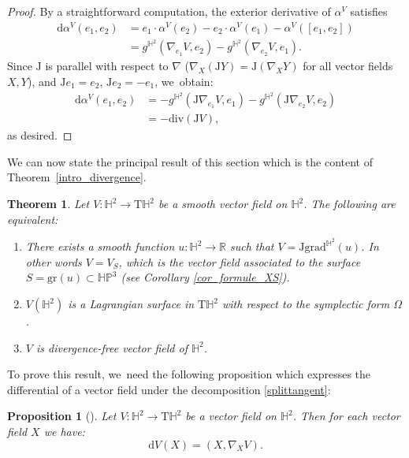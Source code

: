 \documentclass[10pt]{amsart}
\theoremstyle{plain}
\newtheorem{theorem}[cor]{Theorem}
\newtheorem{prop}[cor]{Proposition}
\theoremstyle{definition}
\newcommand{\HP}{\mathbb{HP}^3}
\newcommand{\grad}{\mathrm{grad}^{\mathbb{H}^2}}
\newcommand{\J}{\mathrm{J}}
\begin{document}
\begin{proof}
By a straightforward computation, the exterior derivative of \(\alpha^V \) satisfies
\begin{align*}
\mathrm{d} \alpha^V(e_1, e_2)
&= e_1 \cdot \alpha^V(e_2) - e_2 \cdot \alpha^V(e_1) - \alpha^V([e_1, e_2]) \\
&= g^{\mathbb{H}^2}(\nabla_{e_1} V, e_2) - g^{\mathbb{H}^2}(\nabla_{e_2} V, e_1).
\end{align*}
Since \(\mathrm{J} \) is parallel with respect to \(\nabla \) (\ie \(\nabla_X (\mathrm{J}Y) = \mathrm{J}(\nabla_X Y) \) for all vector fields \(X, Y \)), and \(\mathrm{J}e_1 = e_2 \), \(\mathrm{J}e_2 = -e_1 \), we~obtain:
\begin{align*}
\mathrm{d} \alpha^V(e_1, e_2)
&= -g^{\mathbb{H}^2}(\mathrm{J} \nabla_{e_1} V, e_1) - g^{\mathbb{H}^2}(\J\nabla_{e_2} V, e_2) \\
&= -\mathrm{div}(\mathrm{J}V),
\end{align*}
as desired.
\end{proof}

We can now state the principal result of this section which is the content of Theorem~\ref{intro_divergence}.
\begin{theorem}\label{Lagrange_vs_divergence_free}
Let $V:\mathbb{H}^2\to\mathrm{T}\mathbb{H}^2$ be a smooth vector field on $\mathbb{H}^2$. The following are equivalent:
\begin{enumerate}
\item\label{Lagrange_vs_divergence_free1} There exists a smooth function $u:\mathbb{H}^2\to\mathbb{R}$ such that $V=\J\grad(u)$. In other words $V=V_S$, which is the vector field associated to the surface $S=\mathrm{gr}(u)\subset\HP$ (see Corollary \ref{cor_formule_XS}).
\item\label{Lagrange_vs_divergence_free2} $V(\mathbb{H}^2)$ is a \emph{Lagrangian} surface in $\mathrm{T}\mathbb{H}^2$ with respect to the symplectic form $\Omega$.
\item\label{Lagrange_vs_divergence_free3} $V$ is divergence-free vector field of $\mathbb{H}^2$.
\end{enumerate}
\end{theorem}
To prove this result, we~need the following proposition which expresses the differential of a vector field under the decomposition \eqref{splittangent}:
\begin{prop}[{\cite[Prop.\,1.6]{on_harmonic_vector_field}}]\label{dV(X)}
Let $V:\mathbb{H}^2\to\mathrm{T}\mathbb{H}^2$ be a vector field on $\mathbb{H}^2$. Then for each vector field $X$ we have:
\[
\mathrm{d}V(X)=(X,\nabla_XV).
\]
\end{prop}
\end{document}

